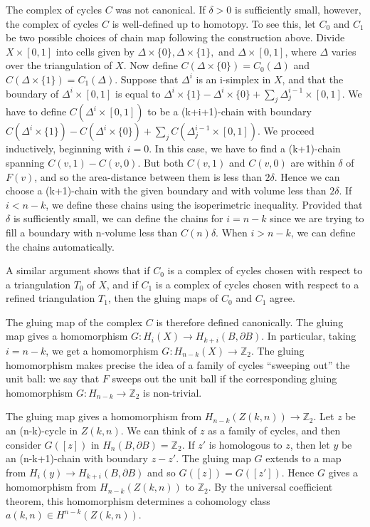 \documentclass{amsart}
\newtheorem*{Theorem 1}{Theorem 1}
\newtheorem*{Theorem 2}{Theorem 2}
\newtheorem*{Theorem 1A}{Theorem 1A}
\newtheorem*{Theorem 2A}{Theorem 2A}
\newtheorem*{vanishing lemma}{Vanishing Lemma}
\numberwithin{equation}{section}
\begin{document}
The complex of cycles $C$ was not canonical.  If $\delta > 0$ is
sufficiently small, however, the complex of cycles $C$ is
well-defined up to homotopy.  To see this, let $C_0$ and $C_1$ be
two possible choices of chain map following the construction
above. Divide $X \times [0,1]$ into cells given by $\Delta \times
\{0\}, \Delta \times \{1 \},$ and $\Delta \times [0,1]$, where
$\Delta$ varies over the triangulation of $X$.  Now define
$C(\Delta \times
\{0\}) = C_0(\Delta)$ and $C(\Delta \times \{1\}) = C_1(\Delta)$. 
Suppose that $\Delta^i$ is an i-simplex in $X$, and that the
boundary of $\Delta^i \times [0,1]$ is equal to $\Delta^i \times
\{ 1 \} - \Delta^i \times \{ 0 \} +
\sum_j \Delta_j^{i-1} \times [0,1]$. 
We have to define $C(\Delta^i \times [0,1])$ to be a
(k+i+1)-chain with boundary $C(\Delta^i \times \{1\}) -
C(\Delta^i \times \{0\}) + \sum_j C(\Delta_j^{i-1} \times
[0,1])$.  We proceed inductively, beginning with $i=0$.  In this
case, we have to find a (k+1)-chain spanning $C(v,1) - C(v,0)$. 
But both $C(v,1)$ and $C(v,0)$ are within $\delta$ of $F(v)$, and
so the area-distance between them is less than $2 \delta$.  Hence
we can choose a (k+1)-chain with the given boundary and with
volume less than $2 \delta$.  If $i <n-k$, we define these chains
using the isoperimetric inequality.  Provided that $\delta$ is
sufficiently small, we can define the chains for $i = n-k$ since
we are trying to fill a boundary with n-volume less than $C(n)
\delta$.  When $i > n-k$, we can define the chains
automatically.

A similar argument shows that if $C_0$ is a complex of cycles
chosen with respect to a triangulation $T_0$ of $X$, and if $C_1$
is a complex of cycles chosen with respect to a refined
triangulation $T_1$, then the gluing maps of $C_0$ and $C_1$ agree.

The gluing map of the complex $C$ is therefore defined canonically.
The gluing map gives a homomorphism $G: H_i(X) \rightarrow H_{k+i}(B,
\partial B)$.  In particular, taking $i = n-k$, we get a homomorphism
$G: H_{n-k}(X) \rightarrow \mathbb{Z}_2$.  The gluing homomorphism
makes precise the idea of a family of cycles ``sweeping out'' the unit
ball: we say that $F$ sweeps out the unit ball if the corresponding
gluing homomorphism $G: H_{n-k} \rightarrow \mathbb{Z}_2$ is non-trivial.

The gluing map gives a homomorphism from $H_{n-k}(Z(k,n))
\rightarrow \mathbb{Z}_2$.  Let $z$ be an (n-k)-cycle in $Z(k,n)$.  
We can think of $z$ as a family of cycles, and then
consider $G([z])$ in $H_n(B, \partial B) =
\mathbb{Z}_2$.  If $z'$ is homologous to $z$, then let $y$ be an
(n-k+1)-chain with boundary $z - z'$.  The gluing map $G$ extends
to a map from $H_i(y) \rightarrow H_{k+i}(B, \partial B)$ and so
$G([z]) = G([z'])$.  Hence $G$ gives a homomorphism from
$H_{n-k}(Z(k,n))$ to $\mathbb{Z}_2$.  By the universal
coefficient theorem, this homomorphism determines a cohomology
class $a(k,n) \in H^{n-k}(Z(k,n))$.
\end{document}
